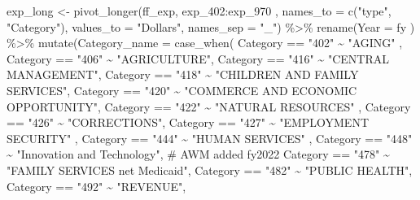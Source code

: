 \documentclass[
  letterpaper,
  DIV=11,
  numbers=noendperiod]{scrreport}
\newenvironment{Shaded}{\begin{snugshade}}{\end{snugshade}}
\newcommand{\AttributeTok}[1]{\textcolor[rgb]{0.40,0.45,0.13}{#1}}
\newcommand{\CommentTok}[1]{\textcolor[rgb]{0.37,0.37,0.37}{#1}}
\newcommand{\FunctionTok}[1]{\textcolor[rgb]{0.28,0.35,0.67}{#1}}
\newcommand{\NormalTok}[1]{\textcolor[rgb]{0.00,0.23,0.31}{#1}}
\newcommand{\OtherTok}[1]{\textcolor[rgb]{0.00,0.23,0.31}{#1}}
\newcommand{\SpecialCharTok}[1]{\textcolor[rgb]{0.37,0.37,0.37}{#1}}
\newcommand{\StringTok}[1]{\textcolor[rgb]{0.13,0.47,0.30}{#1}}
\begin{document}
\begin{Shaded}
\begin{Highlighting}[]
\NormalTok{exp\_long }\OtherTok{\textless{}{-}} \FunctionTok{pivot\_longer}\NormalTok{(ff\_exp, exp\_402}\SpecialCharTok{:}\NormalTok{exp\_970 , }\AttributeTok{names\_to =} \FunctionTok{c}\NormalTok{(}\StringTok{"type"}\NormalTok{, }\StringTok{"Category"}\NormalTok{), }\AttributeTok{values\_to =} \StringTok{"Dollars"}\NormalTok{, }\AttributeTok{names\_sep =} \StringTok{"\_"}\NormalTok{) }\SpecialCharTok{\%\textgreater{}\%} 
  \FunctionTok{rename}\NormalTok{(}\AttributeTok{Year =}\NormalTok{ fy ) }\SpecialCharTok{\%\textgreater{}\%} 
  \FunctionTok{mutate}\NormalTok{(}\AttributeTok{Category\_name =} 
           \FunctionTok{case\_when}\NormalTok{(}
\NormalTok{             Category }\SpecialCharTok{==} \StringTok{"402"} \SpecialCharTok{\textasciitilde{}} \StringTok{"AGING"}\NormalTok{ ,}
\NormalTok{             Category }\SpecialCharTok{==} \StringTok{"406"} \SpecialCharTok{\textasciitilde{}} \StringTok{"AGRICULTURE"}\NormalTok{, }
\NormalTok{             Category }\SpecialCharTok{==} \StringTok{"416"} \SpecialCharTok{\textasciitilde{}} \StringTok{"CENTRAL MANAGEMENT"}\NormalTok{,}
\NormalTok{             Category }\SpecialCharTok{==} \StringTok{"418"} \SpecialCharTok{\textasciitilde{}} \StringTok{"CHILDREN AND FAMILY SERVICES"}\NormalTok{, }
\NormalTok{             Category }\SpecialCharTok{==} \StringTok{"420"} \SpecialCharTok{\textasciitilde{}} \StringTok{"COMMERCE AND ECONOMIC OPPORTUNITY"}\NormalTok{,}
\NormalTok{             Category }\SpecialCharTok{==} \StringTok{"422"} \SpecialCharTok{\textasciitilde{}} \StringTok{"NATURAL RESOURCES"}\NormalTok{ ,}
\NormalTok{             Category }\SpecialCharTok{==} \StringTok{"426"} \SpecialCharTok{\textasciitilde{}} \StringTok{"CORRECTIONS"}\NormalTok{,}
\NormalTok{             Category }\SpecialCharTok{==} \StringTok{"427"} \SpecialCharTok{\textasciitilde{}} \StringTok{"EMPLOYMENT SECURITY"}\NormalTok{ ,}
\NormalTok{             Category }\SpecialCharTok{==} \StringTok{"444"} \SpecialCharTok{\textasciitilde{}} \StringTok{"HUMAN SERVICES"}\NormalTok{ ,}
\NormalTok{             Category }\SpecialCharTok{==} \StringTok{"448"} \SpecialCharTok{\textasciitilde{}} \StringTok{"Innovation and Technology"}\NormalTok{, }\CommentTok{\# AWM added fy2022}
\NormalTok{             Category }\SpecialCharTok{==} \StringTok{"478"} \SpecialCharTok{\textasciitilde{}} \StringTok{"FAMILY SERVICES net Medicaid"}\NormalTok{, }
\NormalTok{             Category }\SpecialCharTok{==} \StringTok{"482"} \SpecialCharTok{\textasciitilde{}} \StringTok{"PUBLIC HEALTH"}\NormalTok{, }
\NormalTok{             Category }\SpecialCharTok{==} \StringTok{"492"} \SpecialCharTok{\textasciitilde{}} \StringTok{"REVENUE"}\NormalTok{, }

\end{Highlighting}
\end{Shaded}
\end{document}
